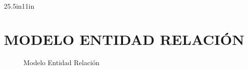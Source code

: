 \begin{paginaAmpliada}{25.5in}{11in}
\chapter{MODELO ENTIDAD RELACIÓN}
\begin{figure}[H]
    \centering
    
    \caption{Modelo Entidad Relación}
    \label{fig:modelo-entidad-relacion}
\end{figure}
\end{paginaAmpliada}
